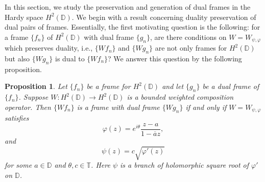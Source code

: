 \documentclass{amsart}
\newtheorem{prop}[thm]{Proposition}
\theoremstyle{definition}
\theoremstyle{remark}
\numberwithin{equation}{section}
\newcommand{\D}{\mathbb{D}} %
\begin{document}
In this section, we study the preservation and generation of dual frames in the Hardy space $H^{2}(\mathbb{D})$. We begin with a result concerning duality preservation of dual pairs of frames. Essentially, the first motivating question is the following: for a frame $\{f_{n}\}$ of $H^{2}(\mathbb{D})$ with dual frame $\{g_{n}\}$, are there conditions on $W=W_{\psi,\varphi}$ which preserves duality, i.e., $\{Wf_{n}\}$ and $\{Wg_{n}\}$ are not only frames for $H^{2}(\mathbb{D})$ but also $\{Wg_{n}\}$ is dual to $\{Wf_{n}\}$? We answer this question by the following proposition. 
\begin{prop}\label{W_on_both}
    Let $\{f_{n}\}$ be a frame for $H^{2}(\mathbb{D})$ and let $\{g_{n}\}$ be a dual frame of $\{f_{n}\}$. Suppose $W:H^{2}(\mathbb{D})\to H^{2}(\mathbb{D})$ is a bounded weighted composition operator. Then $\{Wf_{n}\}$ is a frame with dual frame $\{Wg_{n}\}$ if and only if $W=W_{\psi,\varphi}$ satisfies 
    \begin{equation*}
        \varphi(z)=e^{i\theta}\frac{z-a}{1-\overline{a}z}, 
    \end{equation*}
    and 
    \begin{equation*}
        \psi(z) = c \sqrt{\varphi'(z)}
    \end{equation*}
    for some $a\in\mathbb{D}$ and $\theta, c \in\mathbb{T}$.
    Here $\psi$ is a branch of holomorphic square root of $\varphi'$ on $\D$.
\end{prop}
\end{document}
